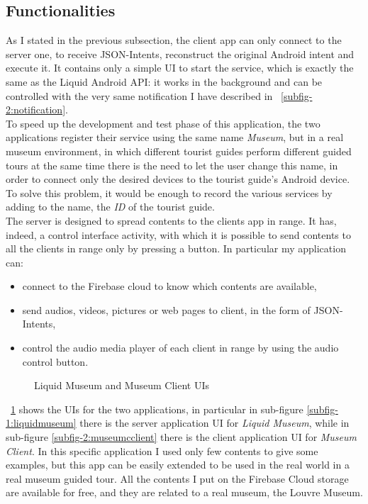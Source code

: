 \subsection{Functionalities}
As I stated in the previous subsection, the client app can only connect to the server one, to receive JSON-Intents, reconstruct the original Android intent and execute it. It contains only a simple UI to start the service, which is exactly the same as the Liquid Android API: it works in the background and can be controlled with the very same notification I have described in \figurename~\ref{subfig-2:notification}. \\
To speed up the development and test phase of this application, the two applications register their service using the same name \textit{Museum}, but in a real museum environment, in which different tourist guides perform different guided tours at the same time there is the need to let the user change this name, in order to connect only the desired devices to the tourist guide's Android device. To solve this problem, it would be enough to record the various services by adding to the name, the \textit{ID} of the tourist guide.\\
The server is designed to spread contents to the clients app in range. It has, indeed, a control interface activity, with which it is possible to send contents to all the clients in range only by pressing a button. In particular my application can:
\begin{itemize}
	\item connect to the Firebase cloud to know which contents are available,
	\item send audios, videos, pictures or web pages to client, in the form of JSON-Intents,
	\item control the audio media player of each client in range by using the audio control button.
\end{itemize}
\begin{figure}[h]
	\centering
	\begin{minipage}{.49\textwidth}\centering
	\end{minipage}
	\begin{minipage}{.49\textwidth}\centering
	\end{minipage}
	\caption{Liquid Museum and Museum Client UIs}
	\label{fig:5.11}
\end{figure}
\figurename~\ref{fig:5.11} shows the UIs for the two applications, in particular in sub-figure \ref{subfig-1:liquidmuseum} there is the server application UI for \textit{Liquid Museum}, while in sub-figure \ref{subfig-2:museumcclient} there is the client application UI for \textit{Museum Client}. In this specific application I used only few contents to give some examples, but this app can be easily extended to be used in the real world in a real museum guided tour. All the contents I put on the Firebase Cloud storage are available for free, and they are related to a real museum, the Louvre Museum.
